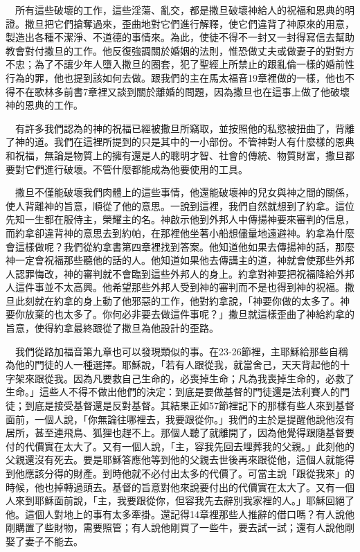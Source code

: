 \documentclass{book}
\begin{document}
　所有這些破壞的工作，這些淫蕩、亂交，都是撒旦破壞神給人的祝福和恩典的明證。撒旦把它們搶奪過來，歪曲地對它們進行解釋，使它們違背了神原來的用意，製造出各種不潔淨、不道德的事情來。為此，使徒不得不一封又一封得寫信去幫助教會對付撒旦的工作。他反復強調關於婚姻的法則，惟恐做丈夫或做妻子的對對方不忠；為了不讓少年人墮入撒旦的圈套，犯了聖經上所禁止的跟亂倫一樣的婚前性行為的罪，他也提到該如何去做。跟我們的主在馬太福音19章裡做的一樣，他也不得不在歌林多前書7章裡又談到關於離婚的問題，因為撒旦也在這事上做了他破壞神的恩典的工作。

　有許多我們認為的神的祝福已經被撒旦所竊取，並按照他的私慾被扭曲了，背離了神的道。我們在這裡所提到的只是其中的一小部份。不管神對人有什麼樣的恩典和祝福，無論是物質上的擁有還是人的聰明才智、社會的傳統、物質財富，撒旦都要對它們進行破壞。不管什麼都能成為他要使用的工具。

　撒旦不僅能破壞我們肉體上的這些事情，他還能破壞神的兒女與神之間的關係，使人背離神的旨意，順從了他的意思。一說到這裡，我們自然就想到了約拿。這位先知一生都在服侍主，榮耀主的名。神啟示他到外邦人中傳揚神要來審判的信息，而約拿卻違背神的意思去到約帕，在那裡他坐著小船想儘量地遠避神。約拿為什麼會這樣做呢？我們從約拿書第四章裡找到答案。他知道他如果去傳揚神的話，那麼神一定會祝福那些聽他的話的人。他知道如果他去傳講主的道，神就會使那些外邦人認罪悔改，神的審判就不會臨到這些外邦人的身上。約拿對神要把祝福降給外邦人這件事並不太高興。他希望那些外邦人受到神的審判而不是也得到神的祝福。撒旦此刻就在約拿的身上動了他邪惡的工作，他對約拿說，「神要你做的太多了。神要你放棄的也太多了。你何必非要去做這件事呢？」撒旦就這樣歪曲了神給約拿的旨意，使得約拿最終跟從了撒旦為他設計的歪路。

　我們從路加福音第九章也可以發現類似的事。在23-26節裡，主耶穌給那些自稱為他的門徒的人一種選擇。耶穌說，「若有人跟從我，就當舍己，天天背起他的十字架來跟從我。因為凡要救自己生命的，必喪掉生命；凡為我喪掉生命的，必救了生命。」這些人不得不做出他們的決定：到底是要做基督的門徒還是法利賽人的門徒；到底是接受基督還是反對基督。其結果正如57節裡記下的那樣有些人來到基督面前，一個人說，「你無論往哪裡去，我要跟從你。」我們的主於是提醒他說他沒有居所，甚至連飛鳥、狐狸也趕不上。那個人聽了就離開了，因為他覺得跟隨基督要付的代價實在太大了。又有一個人說，「主，容我先回去埋葬我的父親。」此刻他的父親還沒有死去。要是耶穌答應他等到他的父親去世後再來跟從他，這個人就能得到他應該分得的財產。到時他就不必付出太多的代價了。可當主說「跟從我來」的時候，他也掉轉過頭去。基督的旨意對他來說要付出的代價實在太大了。又有一個人來到耶穌面前說，「主，我要跟從你，但容我先去辭別我家裡的人。」耶穌回絕了他。這個人對地上的事有太多牽掛。還記得14章裡那些人推辭的借口嗎？有人說他剛購置了些財物，需要照管；有人說他剛買了一些牛，要去試一試；還有人說他剛娶了妻子不能去。
\end{document}
